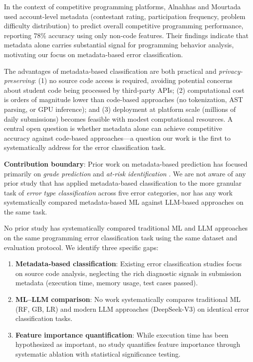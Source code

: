 \documentclass[10pt,letterpaper]{article}
\begin{document}
In the context of competitive programming platforms, Alnahhas and Mourtada
\cite{alnahhas2020predicting} used account-level metadata (contestant
rating, participation frequency, problem difficulty distribution) to predict
overall competitive programming performance, reporting 78\% accuracy using
only non-code features. Their findings indicate that metadata alone carries
substantial signal for programming behavior analysis, motivating our focus on
metadata-based error classification.

The advantages of metadata-based classification are both practical and\textit{ privacy-preserving}: (1) no source code access is required, avoiding
potential concerns about student code being processed by third-party APIs;
(2) computational cost is orders of magnitude lower than code-based
approaches (no tokenization, AST parsing, or GPU inference); and
(3) deployment at platform scale (millions of daily submissions) becomes
feasible with modest computational resources. A central open question
is whether metadata alone can achieve competitive accuracy against
code-based approaches—a question our work is the first to systematically
address for the error classification task.

\noindent\textbf{Contribution boundary}: Prior work on metadata-based prediction
has focused primarily on \textit{grade prediction} and \textit{at-risk
identification} \cite{wang2017learning,pears2007survey}. We are not aware of any prior study that has applied metadata-based classification to the more granular
task of \textit{error type classification} across five error categories, nor
has any work systematically compared metadata-based ML against LLM-based
approaches on the same task.

No prior study has systematically compared traditional ML and
LLM approaches on the same programming error classification task using the
same dataset and evaluation protocol. We identify three specific gaps:

\begin{enumerate}
    \item \textbf{Metadata-based classification}: Existing error classification
          studies focus on source code analysis, neglecting the rich diagnostic
          signals in submission metadata (execution time, memory usage, test cases
          passed).
    \item \textbf{ML--LLM comparison}: No work systematically compares traditional
          ML (RF, GB, LR) and modern LLM approaches (DeepSeek-V3)
          on identical error classification tasks.
    \item \textbf{Feature importance quantification}: While execution time has been
          hypothesized as important, no study quantifies feature importance through
          systematic ablation with statistical significance testing.
\end{enumerate}
\end{document}
